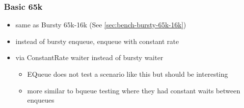 \subsubsection{Basic 65k}
\begin{itemize}
    \item same as Bursty 65k-16k (See \autoref{sec:bench-bursty-65k-16k})
    \item instead of bursty enqueue, enqueue with constant rate
    \item via ConstantRate waiter instead of bursty waiter
        \begin{itemize}
            \item EQueue does not test a scenario like this but should be interesting
            \item more similar to bqueue testing where they had constant waits between enqueues
        \end{itemize}
\end{itemize}
